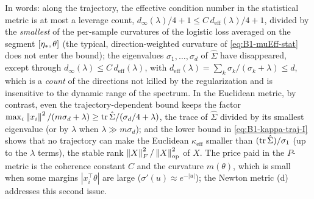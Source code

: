 In words: along the trajectory, the effective condition number in the statistical metric is at most a
leverage count, $d_\infty(\lambda)/4+1\le C\,d_{\mathrm{eff}}(\lambda)/4+1$, divided by the \emph{smallest} of the
per-sample curvatures of the logistic loss averaged on the segment $[\eta_\ast,\theta]$ (the typical,
direction-weighted curvature of \eqref{eq:B1-muEff-stat} does not enter the bound); the eigenvalues
$\sigma_1,\dots,\sigma_d$ of $\hat\Sigma$ have disappeared, except through
$d_\infty(\lambda)\le C\,d_{\mathrm{eff}}(\lambda)$, with
$d_{\mathrm{eff}}(\lambda)=\sum_k\sigma_k/(\sigma_k+\lambda)\le d$, which is a \emph{count} of the directions
not killed by the regularization and is insensitive to the dynamic range of the spectrum. In the Euclidean
metric, by contrast, even the trajectory-dependent bound keeps the factor
$\max_i\left\|x_i\right\|^2/(m\sigma_d+\lambda)\ge\operatorname{tr}\hat\Sigma/(\sigma_d/4+\lambda)$, the trace of $\hat\Sigma$
divided by its smallest eigenvalue (or by $\lambda$ when $\lambda\gg m\sigma_d$); and the lower bound in
\eqref{eq:B1-kappa-traj-I} shows that no trajectory can make the Euclidean $\kappa_{\mathrm{eff}}$ smaller
than $(\operatorname{tr}\hat\Sigma)/\sigma_1$ (up to the $\lambda$ terms), the stable rank $\left\|X\right\|_F^2/\left\|X\right\|_{\mathrm{op}}^2$ of $X$. The
price paid in the $P$-metric is the coherence constant $C$ and the curvature $m(\theta)$, which is small
when some margins $|x_i^\top\theta|$ are large ($\sigma'(u)\approx e^{-|u|}$); the Newton metric (d)
addresses this second issue.

